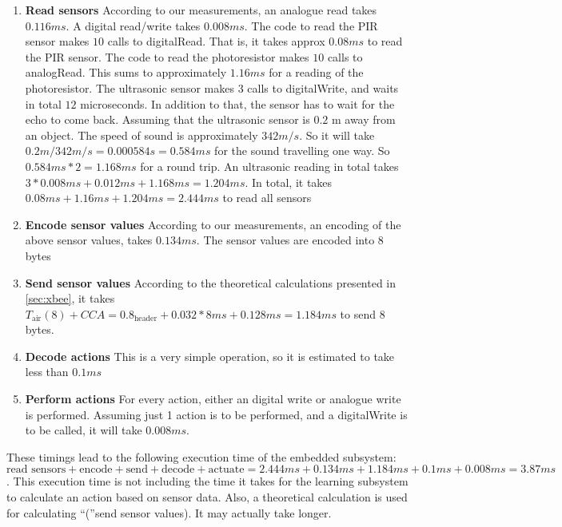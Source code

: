  \begin{enumerate}
  \item \textbf{Read sensors} According to our measurements, an analogue read takes $0.116 ms$. A digital read/write takes $0.008 ms$. The code to read the PIR sensor makes $10$ calls to digitalRead. That is, it takes approx $0.08 ms$ to read the PIR sensor. The code to read the photoresistor makes $10$ calls to analogRead. This sums to approximately $1.16 ms$ for a reading of the photoresistor. The ultrasonic sensor makes $3$ calls to digitalWrite, and waits in total $12$ microseconds. In addition to that, the sensor has to wait for the echo to come back. Assuming that the ultrasonic sensor is $0.2$ m away from an object. The speed of sound is approximately $342 m/s$. So it will take $0.2 m / 342 m/s = 0.000584 s = 0.584 ms$ for the sound travelling one way. So $0.584 ms * 2 = 1.168 ms$ for a round trip. An ultrasonic reading in total takes $3 * 0.008 ms + 0.012 ms + 1.168 ms = 1.204 ms$. In total, it takes $0.08 ms + 1.16 ms + 1.204 ms = 2.444 ms$ to read all sensors
  \item \textbf{Encode sensor values} According to our measurements, an encoding of the above sensor values, takes $0.134 ms$. The sensor values are encoded into 8 bytes
  \item \textbf{Send sensor values} According to the theoretical calculations presented in \cref{sec:xbee}, it takes $T_{\text{air}}(8) + CCA = 0.8_{\text{header}} + 0.032*8 ms + 0.128 ms = 1.184 ms$ to send 8 bytes.
  \item \textbf{Decode actions} This is a very simple operation, so it is estimated to take less than $0.1 ms$
  \item \textbf{Perform actions} For every action, either an digital write or analogue write is performed. Assuming just 1 action is to be performed, and a digitalWrite is to be called, it will take $0.008 ms$.
\end{enumerate}

These timings lead to the following execution time of the embedded subsystem: $\text{read sensors} + \text{encode} + \text{send} + \text{decode} + \text{actuate} = 2.444 ms + 0.134 ms + 1.184 ms + 0.1 ms + 0.008 ms = 3.87 ms$. This execution time is not including the time it takes for the learning subsystem to calculate an action based on sensor data. Also, a theoretical calculation is used for calculating \enquote(send sensor values). It may actually take longer.
